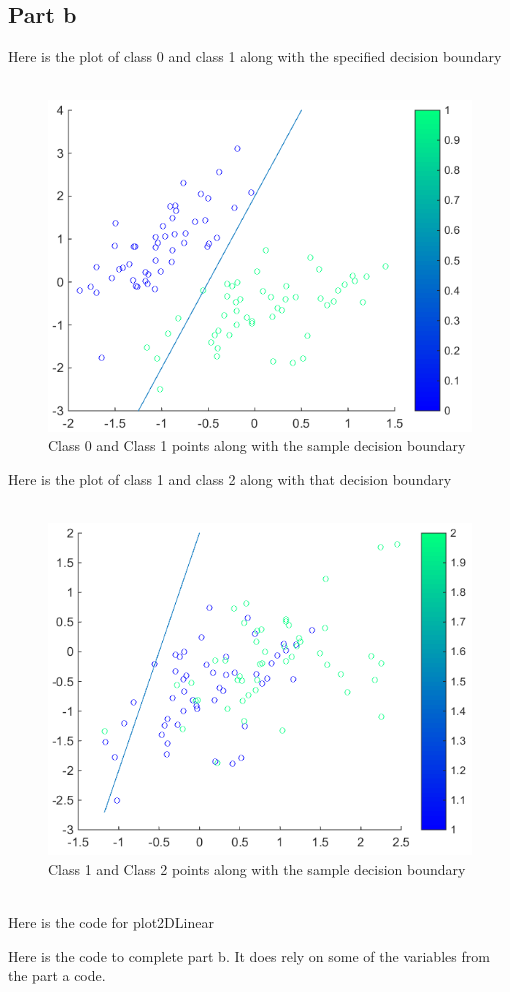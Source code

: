 \documentclass[twoside,11pt]{article}
\theoremstyle{definition}
\begin{document}
\subsection*{Part b}

Here is the plot of class 0 and class 1 along with the specified decision boundary\\
\\
\begin{figure}[h]
\centering
\includegraphics[width=4 in]{prob1bPlot1.png}
\caption{Class 0 and Class 1 points along with the sample decision boundary}
\end{figure}
\newpage
Here is the plot of class 1 and class 2 along with that decision boundary\\
\\
\begin{figure}[h]
\centering
\includegraphics[width=4 in]{prob1bPlot2.png}
\caption{Class 1 and Class 2 points along with the sample decision boundary}
\end{figure}
\\
Here is the code for plot2DLinear

\newpage
Here is the code to complete part b. It does rely on some of the variables from the part a code.

\end{document}
